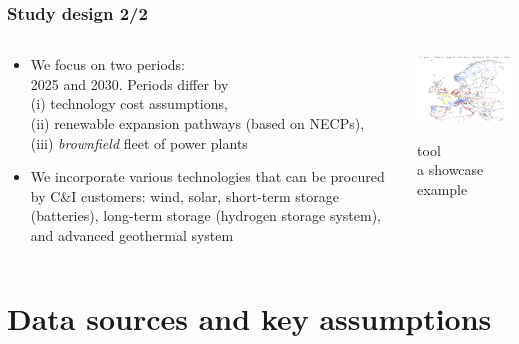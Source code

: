 \begin{frame}
  \frametitle{Study design 2/2}

\begin{columns}[T]
\begin{column}{6cm}

  \begin{itemize}

  \item We focus on two periods: \\ \alert{2025} and \alert{2030}. Periods differ by \\ 
  (i) technology cost assumptions, \\ 
  (ii) renewable expansion pathways (based on NECPs), \\(iii) \emph{brownfield} fleet of power plants
  \item We incorporate various technologies that can be procured by C\&I customers: wind, solar, short-term storage (batteries), long-term storage (hydrogen storage system), and advanced geothermal system
  \end{itemize}

\end{column}

\begin{column}{8cm}

\centering
\includegraphics[width=8cm]{images/powerplantmatching.png}

\vspace{0.1cm}
 tool \\
a showcase example
\end{column}
\end{columns}

\end{frame}


\section{Data sources and key assumptions}


